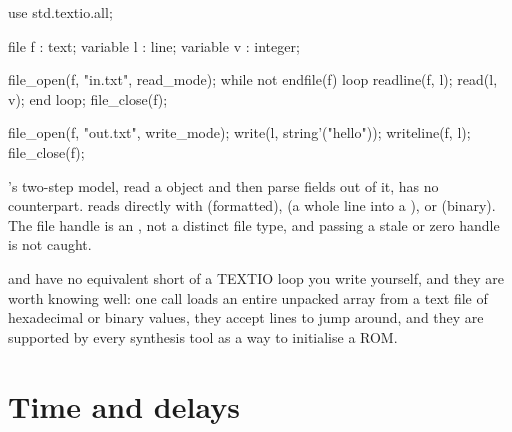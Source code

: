 \begin{rosetta}
\begin{rleft}
use std.textio.all;

file f      : text;
variable l  : line;
variable v  : integer;

file_open(f, "in.txt", read_mode);
while not endfile(f) loop
  readline(f, l);
  read(l, v);
end loop;
file_close(f);

file_open(f, "out.txt", write_mode);
write(l, string'("hello"));
writeline(f, l);
file_close(f);
\end{rleft}
\end{rosetta}


's two-step model, read a  object and then parse
fields out of it, has no \SV{} counterpart. \SV{} reads directly with
 (formatted),  (a whole line into a
), or  (binary). The file handle is an , not a
distinct file type, and passing a stale or zero handle is not caught.

 and  have no \VHDL{} equivalent short of a
TEXTIO loop you write yourself, and they are worth knowing well: one call
loads an entire unpacked array from a text file of hexadecimal or binary
values, they accept  lines to jump around, and they are
supported by every synthesis tool as a way to initialise a ROM.


\section{Time and delays}
\label{sec:rosetta:time}

